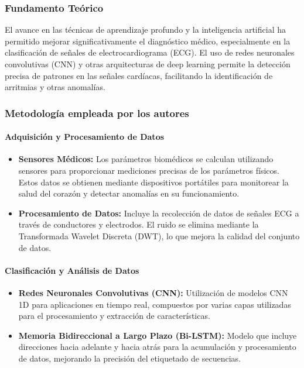 \subsubsection{Fundamento Teórico}

El avance en las técnicas de aprendizaje profundo y la inteligencia artificial ha permitido mejorar significativamente el diagnóstico médico, especialmente en la clasificación de señales de electrocardiograma (ECG). El uso de redes neuronales convolutivas (CNN) y otras arquitecturas de deep learning permite la detección precisa de patrones en las señales cardíacas, facilitando la identificación de arritmias y otras anomalías.

\subsubsection{Metodología empleada por los autores}

\paragraph{Adquisición y Procesamiento de Datos}

\begin{itemize}
    \item \textbf{Sensores Médicos:} Los parámetros biomédicos se calculan utilizando sensores para proporcionar mediciones precisas de los parámetros físicos. Estos datos se obtienen mediante dispositivos portátiles para monitorear la salud del corazón y detectar anomalías en su funcionamiento.
    \item \textbf{Procesamiento de Datos:} Incluye la recolección de datos de señales ECG a través de conductores y electrodos. El ruido se elimina mediante la Transformada Wavelet Discreta (DWT), lo que mejora la calidad del conjunto de datos.
\end{itemize}

\paragraph{Clasificación y Análisis de Datos}

\begin{itemize}
    \item \textbf{Redes Neuronales Convolutivas (CNN):} Utilización de modelos CNN 1D para aplicaciones en tiempo real, compuestos por varias capas utilizadas para el procesamiento y extracción de características.
    \item \textbf{Memoria Bidireccional a Largo Plazo (Bi-LSTM):} Modelo que incluye direcciones hacia adelante y hacia atrás para la acumulación y procesamiento de datos, mejorando la precisión del etiquetado de secuencias.
\end{itemize}

